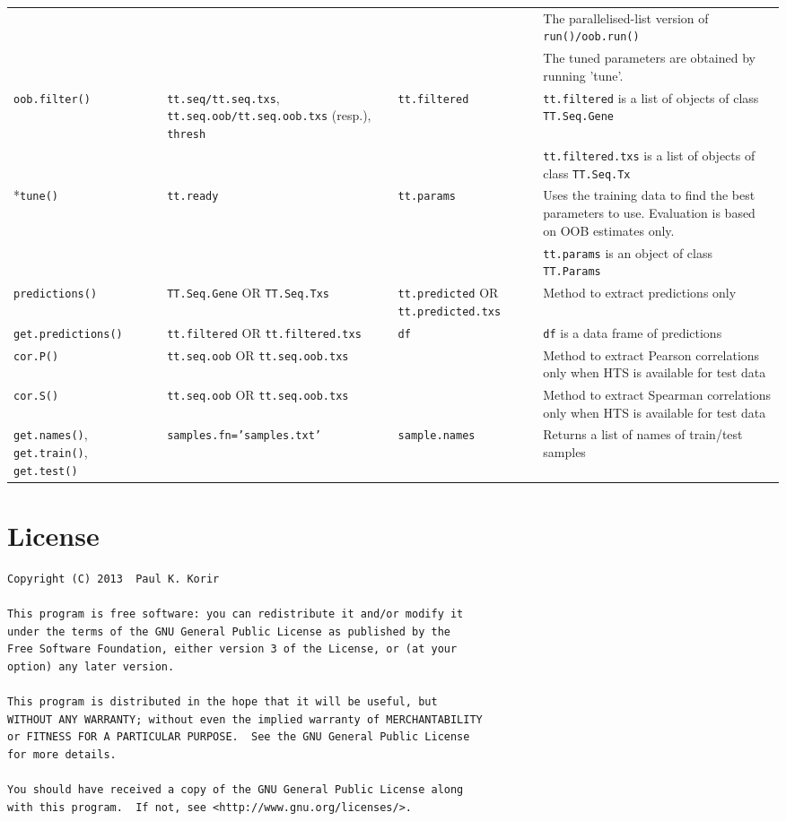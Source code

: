 \documentclass[a4paper,12pt]{article}
\begin{document}
\begin{table}[H]
\begin{tabular}{|p{2.5cm}|p{4cm}|p{4cm}|p{5cm}|}
 & & & The parallelised-list version of \texttt{run()/oob.run()} \\
 & & & The tuned parameters are obtained by running 'tune'. \\
\hline
\texttt{oob.filter()} & \texttt{tt.seq/tt.seq.txs}, \texttt{tt.seq.oob/tt.seq.oob.txs} (resp.), \texttt{thresh} & \texttt{tt.filtered} & \texttt{tt.filtered} is a list of objects of class \texttt{TT.Seq.Gene} \\
 & & & \texttt{tt.filtered.txs} is a list of objects of class \texttt{TT.Seq.Tx} \\
\hline
*\texttt{tune()} & \texttt{tt.ready} & \texttt{tt.params} & Uses the training data to find the best parameters to use. Evaluation is based on OOB estimates only. \\
 & & & \texttt{tt.params} is an object of class \texttt{TT.Params} \\
\hline
\texttt{predictions()} & \texttt{TT.Seq.Gene} OR \texttt{TT.Seq.Txs} & \texttt{tt.predicted} OR \texttt{tt.predicted.txs} & Method to extract predictions only \\
\hline
\texttt{get.predictions()} & \texttt{tt.filtered} OR \texttt{tt.filtered.txs} & \texttt{df} & \texttt{df} is a data frame of predictions \\
\hline
\texttt{cor.P()} & \texttt{tt.seq.oob} OR \texttt{tt.seq.oob.txs} &  & Method to extract Pearson correlations only when HTS is available for test data \\
\hline
\texttt{cor.S()} & \texttt{tt.seq.oob} OR \texttt{tt.seq.oob.txs} &  & Method to extract Spearman correlations only when HTS is available for test data \\
\hline
\texttt{get.names()}, \texttt{get.train()}, \texttt{get.test()} & \texttt{samples.fn='samples.txt'} & \texttt{sample.names} & Returns a list of names of train/test samples \\
\hline
\end{tabular}
\end{table}

\pagebreak
\section{License}
\label{license}
\begin{verbatim}
Copyright (C) 2013  Paul K. Korir 

This program is free software: you can redistribute it and/or modify it
under the terms of the GNU General Public License as published by the 
Free Software Foundation, either version 3 of the License, or (at your
option) any later version.

This program is distributed in the hope that it will be useful, but 
WITHOUT ANY WARRANTY; without even the implied warranty of MERCHANTABILITY
or FITNESS FOR A PARTICULAR PURPOSE.  See the GNU General Public License 
for more details.

You should have received a copy of the GNU General Public License along 
with this program.  If not, see <http://www.gnu.org/licenses/>.
\end{verbatim}
\end{document}
